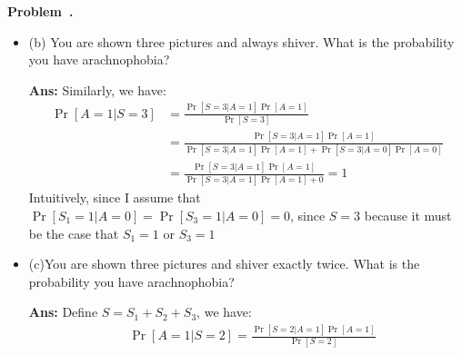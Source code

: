 \documentclass{article}
\newcounter{problem}[section]
\newenvironment{problem}[1][]{\refstepcounter{problem}\par\medskip
   \noindent \textbf{Problem~\theproblem. #1} \rmfamily}{\medskip}
\newenvironment{proof}{\begin{mdframed}\textbf{Ans:}}{ \end{mdframed}}
\begin{document}
\begin{problem}
\begin{itemize}
\begin{proof}
\begin{itemize}
			\item Let $S = S_1 + S_2 + S_3$
		\end{itemize}
		Since we assume that:
		\begin{equation*}
		\begin{split}
		&\Pr[S_1 = 1 | A = 0] = \Pr[S_3 = 1| A = 0] = 0\\&\Pr[S_1 = 0 | A = 0] = \Pr[S_3 = 0| A = 0] = 1
		\end{split}
		\end{equation*}
		and $S_1,S_2,S_3$ are conditionally independent.
		\\We have:
		\begin{equation*}
		\begin{split}
			\Pr[A = 1| S= 0] &= \frac{\Pr[S=0 | A = 1]\Pr[A = 1]}{\Pr[S=0]}\\
			&= \frac{\Pr[S = 0 | A = 1]\Pr[A = 1]}{\Pr[S = 0| A = 1]\Pr[A=1] + \Pr[S = 0| A = 0]\Pr[A=0]}\\
			&= \frac{0.1^3\cdot 0.3}{0.1^3\cdot 0.3 + 0.8\cdot 0.7} = 5.34 \cdot 10^{-4}
		\end{split}
		\end{equation*}
	\end{proof}
	\newpage
	\item (b) You are shown three pictures and always shiver. What is the probability you have arachnophobia?
	\begin{proof}
		Similarly, we have:
		\begin{equation*}
		\begin{split}
			\Pr[A = 1| S = 3] &= \frac{\Pr[S = 3 | A = 1]\Pr[A = 1]}{\Pr[S = 3]}\\
			&= \frac{\Pr[S=3| A = 1]\Pr[A = 1]}{\Pr[S= 3| A = 1]\Pr[A=1] + \Pr[S=3| A = 0]\Pr[A=0]}\\
			&= \frac{\Pr[S=3| A = 1]\Pr[A = 1]}{\Pr[S= 3| A = 1]\Pr[A=1] + 0} = 1
		\end{split}
		\end{equation*}
		Intuitively, since I assume that $\Pr[S_1 = 1 | A = 0] = \Pr[S_3 = 1| A = 0] = 0$,  since $S=3$ because it must be the case that $S_1 = 1$ or $S_3 =1$
	\end{proof}
	\item (c)You are shown three pictures and shiver exactly twice. What is the probability you have arachnophobia?
	\begin{proof}
		Define $S = S_1 + S_2 + S_3$, we have:
		\begin{equation*}
		\begin{split}
			&\Pr[A = 1| S = 2] = \frac{\Pr[S=2 | A = 1]\Pr[A = 1]}{\Pr[S=2]}\\

\end{split}
\end{equation*}
\end{proof}
\end{itemize}
\end{problem}
\end{document}
